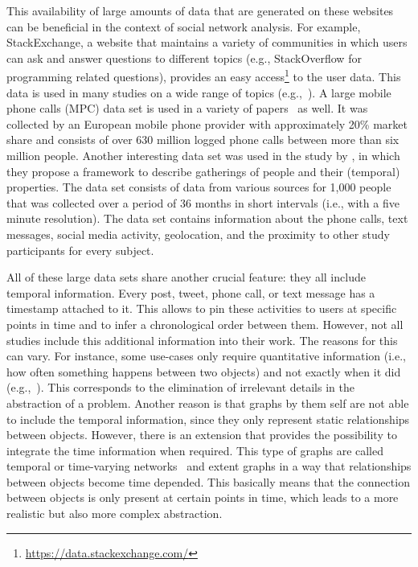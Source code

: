 This availability of large amounts of data that are generated on these websites can be beneficial in the context of social network analysis.
For example, StackExchange, a website that maintains a variety of communities in which users can ask and answer questions to different topics (e.g., StackOverflow for programming related questions), provides an easy access\footnote{\url{https://data.stackexchange.com/}} to the user data.
This data is used in many studies on a wide range of topics (e.g.,~\cite{Danescu2013,Walk2016, Hasani-Mavriqi2016}).
A large mobile phone calls (MPC) data set is used in a variety of papers~\cite{Onnela2007, Karsai2014, Murase2015, Laurent2015} as well.
It was collected by an European mobile phone provider with approximately 20\% market share and consists of over 630 million logged phone calls between more than six million people.
Another interesting data set was used in the study by \citet{Sekara2016}, in which they propose a framework to describe gatherings of people and their (temporal) properties.
The data set consists of data from various sources for 1,000 people that was collected over a period of 36 months in short intervals (i.e., with a five minute resolution).
The data set contains information about the phone calls, text messages, social media activity, geolocation, and the proximity to other study participants for every subject.

All of these large data sets share another crucial feature: they all include temporal information.
Every post, tweet, phone call, or text message has a timestamp attached to it.
This allows to pin these activities to users at specific points in time and to infer a chronological order between them.
However, not all studies include this additional information into their work.
The reasons for this can vary.
For instance, some use-cases only require quantitative information (i.e., how often something happens between two objects) and not exactly when it did  (e.g.,~\cite{Kumpula2007, Bagler2008}).
This corresponds to the elimination of irrelevant details in the abstraction of a problem.
Another reason is that graphs by them self are not able to include the temporal information, since they only represent static relationships between objects.
However, there is an extension that provides the possibility to integrate the time information when required.
This type of graphs are called temporal or time-varying networks~\cite{Holme2012, Holme2015} and extent graphs in a way that relationships between objects become time depended.
This basically means that the connection between objects is only present at certain points in time, which leads to a more realistic but also more complex abstraction.

